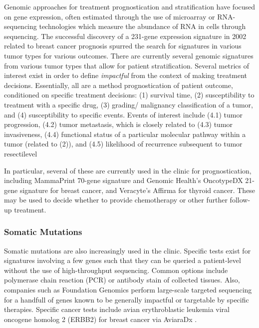       Genomic approaches for treatment prognostication and
      stratification have focused on gene expression, often estimated through the use of microarray
      or RNA-sequencing technologies which measure the abundance of
      RNA in cells through sequencing. The successful discovery of a 231-gene expression signature in 2002 related to breast
      cancer prognosis\cite{van_t_veer_gene_2002} spurred the search for signatures in various
      tumor types for various outcomes. There are currently several genomic signatures from various
      tumor types that allow for patient stratification. Several
      metrics of interest exist in order to define \textit{impactful}
     from the context of making treatment decisions. Essentially, all
     are a method prognostication of patient outcome, conditioned on
     specific treatment decisions:
      (1) survival time, (2) susceptibility to treatment with a
      specific drug, (3) grading/ malignancy classification of a
      tumor, and (4) susceptibility to specific events. Events of
      interest include (4.1) tumor progression, (4.2) tumor
      metastasis, which is closely related to (4.3) tumor
      invasiveness, (4.4) functional status of a particular
      molecular pathway within a tumor (related to (2)), and (4.5)
      likelihood of recurrence subsequent to tumor resectilevel
      
      In particular, several of these are currently used in the
      clinic for prognostication, including
      MammaPrint\textsuperscript{\textregistered} 70-gene signature and 
      Genomic Health's OncotypeDX\textsuperscript{\textregistered}
      21-gene signature for
      breast cancer,
      and Veracyte's Affirma\textsuperscript{\textregistered} for
      thyroid cancer. These may be used to decide whether to provide
      chemotherapy or other further follow-up treatment.

      \subsubsection{Somatic Mutations}
      Somatic mutations are also increasingly used in the
      clinic. Specific tests exist for signatures involving a few
      genes such that they can be queried a patient-level without the use of
      high-throughput sequencing. Common options include polymerase
      chain reaction (PCR) or antibody stain of collected
      tissues. Also, companies such as Foundation Genomics
      \textsuperscript{\textregistered} perform large-scale targeted
      sequencing for a handfull of genes known to be generally
      impactful or targetable by specific therapies. Specific cancer
      tests include avian erythroblastic leukemia viral oncogene
      homolog 2 (ERBB2) for breast cancer via AviaraDx \textsuperscript{\textregistered}.

